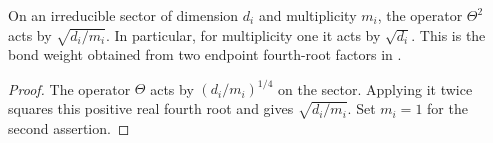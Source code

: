 \begin{lemma}%
    \label{thm:peps_representation_theta_squared}
    \leanok
    On an irreducible sector of dimension $d_i$ and multiplicity $m_i$,
    the operator $\Theta^2$ acts by $\sqrt{d_i/m_i}$. In particular, for
    multiplicity one it acts by $\sqrt{d_i}$. This is the bond weight
    obtained from two endpoint fourth-root factors in
    \cite[Section~7]{Schuch2010PEPS}.
\end{lemma}

\begin{proof}\leanok
    The operator $\Theta$ acts by $(d_i/m_i)^{1/4}$ on the sector.
    Applying it twice squares this positive real fourth root and gives
    $\sqrt{d_i/m_i}$. Set $m_i=1$ for the second assertion.
\end{proof}
